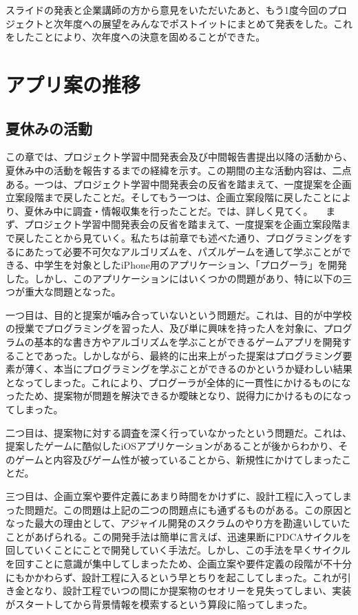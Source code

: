 \documentclass[openany,11pt,papersize]{jsbook}
\begin{document}
スライドの発表と企業講師の方から意見をいただいたあと、もう1度今回のプロジェクトと次年度への展望をみんなでポストイットにまとめて発表をした。これをしたことにより、次年度への決意を固めることができた。

\section{アプリ案の推移}

\subsection{夏休みの活動}
\par この章では、プロジェクト学習中間発表会及び中間報告書提出以降の活動から、夏休み中の活動を報告するまでの経緯を示す。この期間の主な活動内容は、二点ある。一つは、プロジェクト学習中間発表会の反省を踏まえて、一度提案を企画立案段階まで戻したことだ。そしてもう一つは、企画立案段階に戻したことにより、夏休み中に調査・情報収集を行ったことだ。では、詳しく見てく。
　まず、プロジェクト学習中間発表会の反省を踏まえて、一度提案を企画立案段階まで戻したことから見ていく。私たちは前章でも述べた通り、プログラミングをするにあたって必要不可欠なアルゴリズムを、パズルゲームを通して学ぶことができる、中学生を対象としたiPhone用のアプリケーション、「プログーラ」を開発した。しかし、このアプリケーションにはいくつかの問題があり、特に以下の三つが重大な問題となった。
\par 一つ目は、目的と提案が噛み合っていないという問題だ。これは、目的が中学校の授業でプログラミングを習った人、及び単に興味を持った人を対象に、プログラムの基本的な書き方やアルゴリズムを学ぶことができるゲームアプリを開発することであった。しかしながら、最終的に出来上がった提案はプログラミング要素が薄く、本当にプログラミングを学ぶことができるのかというか疑わしい結果となってしまった。これにより、プログーラが全体的に一貫性にかけるものになったため、提案物が問題を解決できるか曖昧となり、説得力にかけるものになってしまった。
\par 二つ目は、提案物に対する調査を深く行っていなかったという問題だ。これは、提案したゲームに酷似したiOSアプリケーションがあることが後からわかり、そのゲームと内容及びゲーム性が被っていることから、新規性にかけてしまったことだ。
\par 三つ目は、企画立案や要件定義にあまり時間をかけずに、設計工程に入ってしまった問題だ。この問題は上記の二つの問題点にも通ずるものがある。この原因となった最大の理由として、アジャイル開発のスクラムのやり方を勘違いしていたことがあげられる。この開発手法は簡単に言えば、迅速果断にPDCAサイクルを回していくことにことで開発していく手法だ。しかし、この手法を早くサイクルを回すことに意識が集中してしまったため、企画立案や要件定義の段階が不十分にもかかわらず、設計工程に入るという早とちりを起こしてしまった。これが引き金となり、設計工程でいつの間にか提案物のセオリーを見失ってしまい、実装がスタートしてから背景情報を模索するという算段に陥ってしまった。
\end{document}
